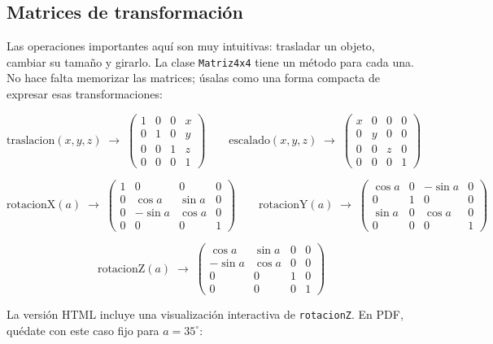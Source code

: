 \documentclass[
  spanish,
  11pt,
  a4paper,
  DIV=11,
  numbers=noendperiod]{scrartcl}
\begin{document}
\subsection{Matrices de transformación}

\label{matrices-de-transformación}

Las operaciones importantes aquí son muy intuitivas: trasladar un objeto, cambiar su tamaño y girarlo. La clase \texttt{Matriz4x4} tiene un método para cada una. No hace falta memorizar las matrices; úsalas como una forma compacta de expresar esas transformaciones:

\[
\text{traslacion}(x,y,z) \;\to\; \begin{pmatrix} 1 & 0 & 0 & x \\ 0 & 1 & 0 & y \\ 0 & 0 & 1 & z \\ 0 & 0 & 0 & 1 \end{pmatrix}
\qquad
\text{escalado}(x,y,z) \;\to\; \begin{pmatrix} x & 0 & 0 & 0 \\ 0 & y & 0 & 0 \\ 0 & 0 & z & 0 \\ 0 & 0 & 0 & 1 \end{pmatrix}
\]

\[
\text{rotacionX}(a) \;\to\; \begin{pmatrix} 1 & 0 & 0 & 0 \\ 0 & \cos a & \sin a & 0 \\ 0 & {-\sin a} & \cos a & 0 \\ 0 & 0 & 0 & 1 \end{pmatrix}
\qquad
\text{rotacionY}(a) \;\to\; \begin{pmatrix} \cos a & 0 & {-\sin a} & 0 \\ 0 & 1 & 0 & 0 \\ \sin a & 0 & \cos a & 0 \\ 0 & 0 & 0 & 1 \end{pmatrix}
\]

\[
\text{rotacionZ}(a) \;\to\; \begin{pmatrix} \cos a & \sin a & 0 & 0 \\ {-\sin a} & \cos a & 0 & 0 \\ 0 & 0 & 1 & 0 \\ 0 & 0 & 0 & 1 \end{pmatrix}
\]

La versión HTML incluye una visualización interactiva de \texttt{rotacionZ}. En PDF, quédate con este caso fijo para \(a=35^\circ\):
\end{document}
